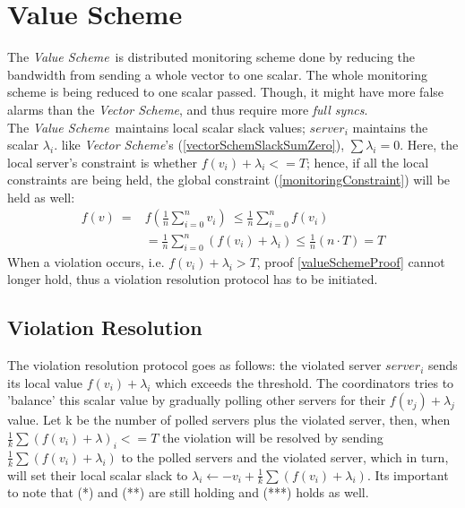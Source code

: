 \documentclass[10pt, conference]{IEEEtran}
\newcommand{\vecScheme}{\textit{Vector Scheme}}
\newcommand{\valueScheme}{\textit{Value Scheme}}
\begin{document}
\section{Value Scheme}
The \valueScheme \ is distributed monitoring scheme done by reducing the bandwidth from sending a whole vector to one scalar. The whole monitoring scheme is being reduced to one scalar passed. Though, it might have more false alarms than the \vecScheme , and thus require more \textit{full syncs}. \\
The \valueScheme \  maintains local scalar slack values; $server_i$ maintains the scalar $\lambda _i$. like \vecScheme 's (\ref{vectorSchemSlackSumZero}), $\sum{\lambda _i} = 0$. Here, the local server's constraint is whether $f(v_i) + \lambda _i <= T$; hence, if all the local constraints are being held, the global constraint (\ref{monitoringConstraint}) will be held as well:
\begin{equation}
\label{valueSchemeProof}
\begin{aligned}
 f(v)  \
	    ={} & f\left(\frac{1}{n} \sum\limits_{i=0}^{n}{v_i}\right)  \
       \leq   \frac{1}{n} \sum\limits_{i=0}^{n}f(v_i) \\
     &  =   \frac{1}{n} \sum\limits_{i=0}^{n}{(f(v_i) + \lambda _i)}
       \leq   \frac{1}{n}(n \cdot T)
        = T
\end{aligned}
\end{equation}
When a violation occurs, i.e. $f(v_i) + \lambda _i > T$, proof \ref{valueSchemeProof} cannot longer hold, thus a violation resolution protocol has to be initiated.
\subsection{Violation Resolution}
The violation resolution protocol goes as follows: the violated server $server_i$ sends its local value $f(v_i) + \lambda _i$ which exceeds the threshold. The coordinators tries to 'balance' this scalar value by gradually polling other servers for their $f(v_j) + \lambda _j$ value. Let k be the number of polled servers plus the violated server, then, when $\frac{1}{k}\sum{(f(v_i) + \lambda ) _i} <= T$ the violation will be resolved by sending $\frac{1}{k}\sum{(f(v_i) + \lambda _i)}$ to the polled servers and the violated server, which in turn, will set their local scalar slack to $\lambda _i \leftarrow -v_i + \frac{1}{k}\sum{(f(v_i) + \lambda _i)}$. Its important to note that (*) and (**) are still holding and (***) holds as well.
\end{document}
